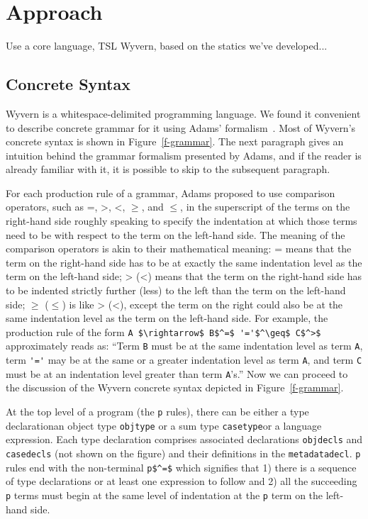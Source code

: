 \section{Approach}
\label{s:approach}
Use a core language, TSL Wyvern, based on the statics we've developed...


\subsection{Concrete Syntax}

Wyvern is a whitespace-delimited programming language. We found it convenient to describe concrete grammar for it using Adams' formalism~\cite{Adams:2013:PPI:2429069.2429129}. Most of Wyvern's concrete syntax is shown in Figure~\ref{f-grammar}. The next paragraph gives an intuition behind the grammar formalism presented by Adams, and if the reader is already familiar with it, it is possible to skip to the subsequent paragraph.

For each production rule of a grammar, Adams proposed to use comparison operators, such as =, >, <, $\geq$, and $\leq$, in the superscript of the terms on the right-hand side roughly speaking to specify the indentation at which those terms need to be with respect to the term on the left-hand side. The meaning of the comparison operators is akin to their mathematical meaning: = means that the term on the right-hand side has to be at exactly the same indentation level as the term on the left-hand side; > (<) means that the term on the right-hand side has to be indented strictly further (less) to the left than the term on the left-hand side; $\geq$ ($\leq$) is like > (<), except the term on the right could also be at the same indentation level as the term on the left-hand side. For example, the production rule of the form \lstinline{A $\rightarrow$ B$^=$ '='$^\geq$ C$^>$} approximately reads as: ``Term \lstinline{B} must be at the same indentation level as term \lstinline{A}, term \lstinline{'='} may be at the same or a greater indentation level as term \lstinline{A}, and term \lstinline{C} must be at an indentation level greater than term \lstinline{A}'s.'' Now we can proceed to the discussion of the Wyvern concrete syntax depicted in Figure~\ref{f-grammar}.



At the top level of a program (the \lstinline{p} rules), there can be either a type declaration\textemdash an object type \lstinline{objtype} or a sum type \lstinline{casetype}\textemdash or a language expression. Each type declaration comprises associated declarations \lstinline{objdecls} and \lstinline{casedecls} (not shown on the figure) and their definitions in the \lstinline{metadatadecl}. \lstinline{p} rules end with the non-terminal \lstinline{p$^=$} which signifies that 1) there is a sequence of type declarations or at least one expression to follow and 2) all the succeeding \lstinline{p} terms must begin at the same level of indentation at the \lstinline{p} term on the left-hand side.

